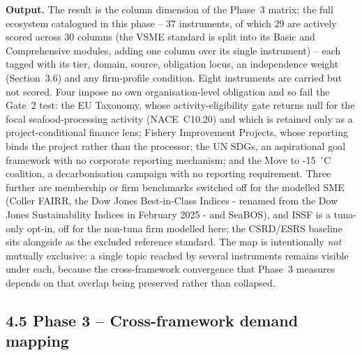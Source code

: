 \documentclass[
]{article}
\begin{document}
\textbf{Output.} The result is the column dimension of the Phase~3
matrix: the full ecosystem catalogued in this phase -- 37 instruments,
of which 29 are actively scored across 30 columns (the VSME standard is
split into its Basic and Comprehensive modules, adding one column over its
single instrument) -- each tagged with its tier, domain, source,
obligation locus, an independence weight (Section~3.6) and any
firm-profile condition. Eight instruments are carried but not scored.
Four impose no own organisation-level obligation and so fail the Gate~2
test: the EU Taxonomy, whose activity-eligibility gate returns null for
the focal seafood-processing activity (NACE~C10.20) and which is retained
only as a project-conditional finance lens; Fishery Improvement Projects,
whose reporting binds the project rather than the processor; the UN SDGs,
an aspirational goal framework with no corporate reporting mechanism; and
the Move to -15~$^{\circ}$C coalition, a decarbonisation campaign with no
reporting requirement. Three further are membership or firm benchmarks
switched off for the modelled SME (Coller FAIRR, the Dow Jones
Best-in-Class Indices - renamed from the Dow Jones Sustainability Indices in
February 2025 - and SeaBOS), and ISSF is a tuna-only opt-in, off for
the non-tuna firm modelled here; the CSRD/ESRS baseline sits alongside as
the excluded reference standard. The map is intentionally
\emph{not} mutually exclusive: a single topic reached by several
instruments remains visible under each, because the cross-framework
convergence that Phase~3 measures depends on that overlap being preserved
rather than collapsed.

\subsection{4.5 Phase 3 -- Cross-framework demand mapping}
\label{phase-3---cross-framework-demand-mapping}
\end{document}
